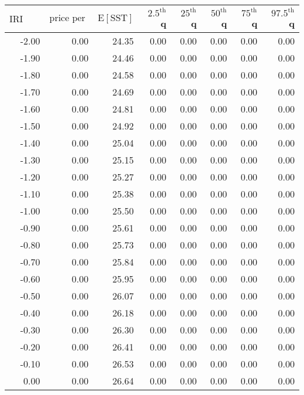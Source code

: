 \begin{table*}[ht]
\centering \footnotesize
\begin{tabular}{rrrrrrrr}
  \hline
$\mbox{IRI anom}$ & $\mbox{price per USD}$ & $\mbox{E}[\mbox{SST}]$ & $2.5^{\mbox{th}}$ q & $25^{\mbox{th}}$ q & $50^{\mbox{th}}$ q & $75^{\mbox{th}}$ q & $97.5^{\mbox{th}}$ q \\ 
  \hline
-2.00 & 0.00 & 24.35 & 0.00 & 0.00 & 0.00 & 0.00 & 0.00 \\ 
  -1.90 & 0.00 & 24.46 & 0.00 & 0.00 & 0.00 & 0.00 & 0.00 \\ 
  -1.80 & 0.00 & 24.58 & 0.00 & 0.00 & 0.00 & 0.00 & 0.00 \\ 
  -1.70 & 0.00 & 24.69 & 0.00 & 0.00 & 0.00 & 0.00 & 0.00 \\ 
  -1.60 & 0.00 & 24.81 & 0.00 & 0.00 & 0.00 & 0.00 & 0.00 \\ 
  -1.50 & 0.00 & 24.92 & 0.00 & 0.00 & 0.00 & 0.00 & 0.00 \\ 
  -1.40 & 0.00 & 25.04 & 0.00 & 0.00 & 0.00 & 0.00 & 0.00 \\ 
  -1.30 & 0.00 & 25.15 & 0.00 & 0.00 & 0.00 & 0.00 & 0.00 \\ 
  -1.20 & 0.00 & 25.27 & 0.00 & 0.00 & 0.00 & 0.00 & 0.00 \\ 
  -1.10 & 0.00 & 25.38 & 0.00 & 0.00 & 0.00 & 0.00 & 0.00 \\ 
  -1.00 & 0.00 & 25.50 & 0.00 & 0.00 & 0.00 & 0.00 & 0.00 \\ 
  -0.90 & 0.00 & 25.61 & 0.00 & 0.00 & 0.00 & 0.00 & 0.00 \\ 
  -0.80 & 0.00 & 25.73 & 0.00 & 0.00 & 0.00 & 0.00 & 0.00 \\ 
  -0.70 & 0.00 & 25.84 & 0.00 & 0.00 & 0.00 & 0.00 & 0.00 \\ 
  -0.60 & 0.00 & 25.95 & 0.00 & 0.00 & 0.00 & 0.00 & 0.00 \\ 
  -0.50 & 0.00 & 26.07 & 0.00 & 0.00 & 0.00 & 0.00 & 0.00 \\ 
  -0.40 & 0.00 & 26.18 & 0.00 & 0.00 & 0.00 & 0.00 & 0.00 \\ 
  -0.30 & 0.00 & 26.30 & 0.00 & 0.00 & 0.00 & 0.00 & 0.00 \\ 
  -0.20 & 0.00 & 26.41 & 0.00 & 0.00 & 0.00 & 0.00 & 0.00 \\ 
  -0.10 & 0.00 & 26.53 & 0.00 & 0.00 & 0.00 & 0.00 & 0.00 \\ 
  0.00 & 0.00 & 26.64 & 0.00 & 0.00 & 0.00 & 0.00 & 0.00 \\ 

\end{tabular}
\end{table*}
